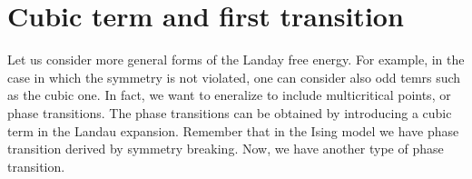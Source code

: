 \documentclass[../main/main.tex]{subfiles}
\begin{document}

\section{Cubic term and first transition}
Let us consider more general forms of the Landay free energy. For example, in the case in which the symmetry is not violated, one can consider also odd temrs such as the cubic one.  In fact, we want to eneralize to include multicritical points, or phase transitions. The phase transitions can be obtained by introducing a cubic term in the Landau expansion. Remember that in the Ising model we have phase transition derived by symmetry breaking. Now, we have another type of phase transition.
\end{document}
